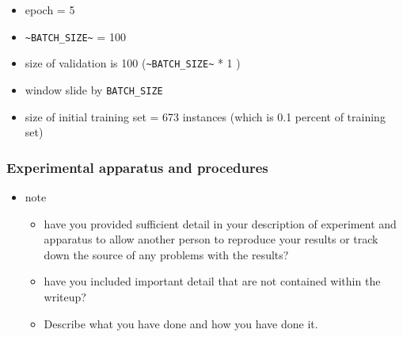 \documentclass[11pt]{article}
\begin{document}
\begin{itemize}
\item epoch = 5
\item \texttt{\textasciitilde{}BATCH\_SIZE\textasciitilde{}} = 100
\item size of validation is 100 (\texttt{\textasciitilde{}BATCH\_SIZE\textasciitilde{}} * 1 )
\item window slide by \texttt{BATCH\_SIZE}
\item size of initial training set = 673 instances (which is 0.1 percent of training set)
\end{itemize}

\subsubsection{Experimental apparatus and procedures}
\label{sec:orgb978e4b}
\begin{itemize}
\item note
\begin{itemize}
\item have you provided sufficient detail in your description of experiment and apparatus to allow another person to reproduce your results or track down the source of any problems with the results?
\item have you included important detail that are not contained within the writeup?
\item Describe what you have done and how you have done it.
\end{itemize}
\end{itemize}
\end{document}
